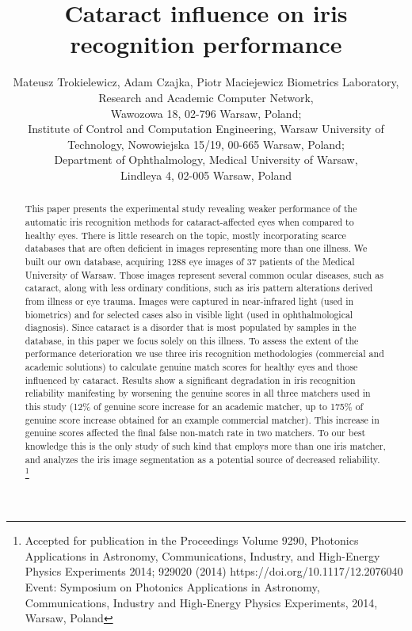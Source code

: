\documentclass[a4paper]{spie}
\title{Cataract influence on iris recognition performance}
\author{Mateusz Trokielewicz\supit{1,2}, Adam Czajka\supit{2,1}, Piotr Maciejewicz\supit{3}
\skiplinehalf
\supit{1}Biometrics Laboratory, Research and Academic Computer Network,\\ Wawozowa 18, 02-796 Warsaw, Poland;\\
\supit{2}Institute of Control and Computation Engineering, Warsaw University of Technology, Nowowiejska 15/19, 00-665 Warsaw, Poland;\\
\supit{3}Department of Ophthalmology, Medical University of Warsaw,\\ Lindleya 4, 02-005 Warsaw, Poland 
}
\begin{document}
 
  \maketitle 

\begin{abstract}
This paper presents the experimental study revealing weaker performance of the automatic iris recognition methods for cataract-affected eyes when compared to healthy eyes. There is little research on the topic, mostly incorporating scarce databases that are often deficient in images representing more than one illness. We built our own database, acquiring 1288 eye images of 37 patients of the Medical University of Warsaw. Those images represent several common ocular diseases, such as cataract, along with less ordinary conditions, such as iris pattern alterations derived from illness or eye trauma. Images were captured in near-infrared light (used in biometrics) and for selected cases also in visible light (used in ophthalmological diagnosis). Since cataract is a disorder that is most populated by samples in the database, in this paper we focus solely on this illness. To assess the extent of the performance deterioration we use three iris recognition methodologies (commercial and academic solutions) to calculate genuine match scores for healthy eyes and those influenced by cataract. Results show a significant degradation in iris recognition reliability manifesting by worsening the genuine scores in all three matchers used in this study (12\% of genuine score increase for an academic matcher, up to 175\% of genuine score increase obtained for an example commercial matcher). This increase in genuine scores affected the final false non-match rate in two matchers. To our best knowledge this is the only study of such kind that employs more than one iris matcher, and analyzes the iris image segmentation as a potential source of decreased reliability. \let\thefootnote\relax\footnote{Accepted for publication in the Proceedings Volume 9290, Photonics Applications in Astronomy, Communications, Industry, and High-Energy Physics Experiments 2014; 929020 (2014) https://doi.org/10.1117/12.2076040
Event: Symposium on Photonics Applications in Astronomy, Communications, Industry and High-Energy Physics Experiments, 2014, Warsaw, Poland}
\end{abstract}
\end{document}
